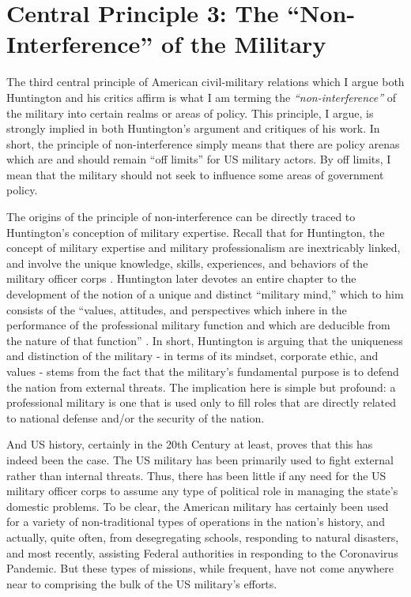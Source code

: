 \documentclass[
  12pt,
  oneside]{memoir}
\begin{document}
\hypertarget{central-principle-3-the-non-interference-of-the-military}{%
\section{Central Principle 3: The ``Non-Interference'' of the Military}\label{central-principle-3-the-non-interference-of-the-military}}

The third central principle of American civil-military relations which I argue both Huntington and his critics affirm is what I am terming the \emph{``non-interference''} of the military into certain realms or areas of policy. This principle, I argue, is strongly implied in both Huntington's argument and critiques of his work. In short, the principle of non-interference simply means that there are policy arenas which are and should remain ``off limits'' for US military actors. By off limits, I mean that the military should not seek to influence some areas of government policy.

The origins of the principle of non-interference can be directly traced to Huntington's conception of military expertise. Recall that for Huntington, the concept of military expertise and military professionalism are inextricably linked, and involve the unique knowledge, skills, experiences, and behaviors of the military officer corps \autocite[7-18]{huntington_soldier_1957}. Huntington later devotes an entire chapter to the development of the notion of a unique and distinct ``military mind,'' which to him consists of the ``values, attitudes, and perspectives which inhere in the performance of the professional military function and which are deducible from the nature of that function'' \autocite[61]{huntington_soldier_1957}. In short, Huntington is arguing that the uniqueness and distinction of the military - in terms of its mindset, corporate ethic, and values - stems from the fact that the military's fundamental purpose is to defend the nation from external threats. The implication here is simple but profound: a professional military is one that is used only to fill roles that are directly related to national defense and/or the security of the nation.

And US history, certainly in the 20th Century at least, proves that this has indeed been the case. The US military has been primarily used to fight external rather than internal threats. Thus, there has been little if any need for the US military officer corps to assume any type of political role in managing the state's domestic problems. To be clear, the American military has certainly been used for a variety of non-traditional types of operations in the nation's history, and actually, quite often, from desegregating schools, responding to natural disasters, and most recently, assisting Federal authorities in responding to the Coronavirus Pandemic. But these types of missions, while frequent, have not come anywhere near to comprising the bulk of the US military's efforts.
\end{document}

